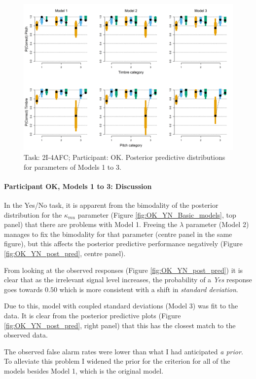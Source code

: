 \documentclass{article}\usepackage{knitr}
\begin{document}
\begin{figure}[H]
\centering
\includegraphics[scale=0.75, angle = 270]{Analysis_of_Human_Data/OK_AFC_post_pred}
\caption{Task: 2I-4AFC; Participant: OK. Posterior predictive distributions for parameters of Models 1 to 3.}
\label{fig:OK_AFC_post_pred}
\end{figure}

\paragraph{Participant OK, Models 1 to 3: Discussion}

In the Yes/No task, it is apparent from the bimodality of the posterior distribution for the $\kappa_{mu}$ parameter (Figure \ref{fig:OK_YN_Basic_models}, top panel) that there are problems with Model 1. Freeing the $\lambda$ parameter (Model 2) manages to fix the bimodality for that parameter (centre panel in the same figure), but this affects the posterior predictive performance negatively (Figure \ref{fig:OK_YN_post_pred}, centre panel). 

From looking at the observed responses (Figure \ref{fig:OK_YN_post_pred}) it is clear that as the irrelevant signal level increases, the probability of a \textit{Yes} response goes towards $0.50$ which is more consistent with a shift in \textit{standard deviation}. 

Due to this, model with coupled standard deviations (Model 3) was fit to the data. It is clear from the posterior predictive plots (Figure \ref{fig:OK_YN_post_pred}, right panel) that this has the closest match to the observed data.

The observed false alarm rates were lower than what I had anticipated \textit{a prior}. To alleviate this problem I widened the prior for the criterion for all of the models besides Model 1, which is the original model.
\end{document}
